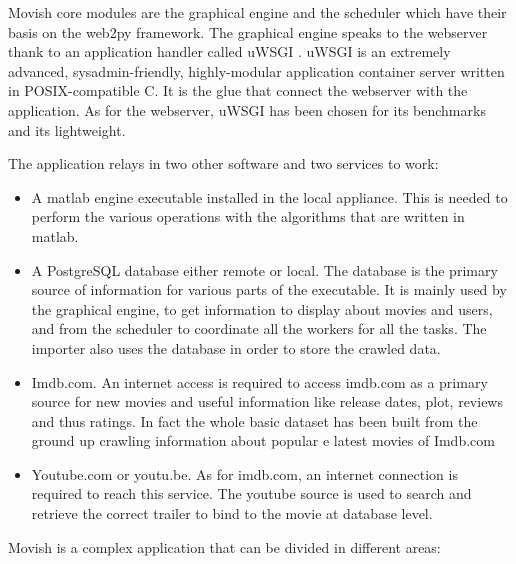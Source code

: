 Movish core modules are the graphical engine and the scheduler which have their basis on the web2py \cite{web2py} framework. The graphical engine speaks to the webserver thank to an application handler called uWSGI \cite{uwsgi}. uWSGI is an extremely advanced, sysadmin-friendly, highly-modular application container server written in POSIX-compatible C. It is the glue that connect the webserver with the application. As for the webserver, uWSGI has been chosen for its benchmarks and its lightweight.

The application relays in two other software and two services to work:

\begin{itemize}
\item A matlab \cite{matlab} engine executable installed in the local appliance. This is needed to perform the various operations with the algorithms that are written in matlab.
\item A PostgreSQL \cite{postgresql} database either remote or local. The database is the primary source of information for various parts of the executable. It is mainly used by the graphical engine, to get information to display about movies and users, and from the scheduler to coordinate all the workers for all the tasks. The importer also uses the database in order to store the crawled data.
\item Imdb.com. An internet access is required to access imdb.com as a primary source for new movies and useful information like release dates, plot, reviews and thus ratings. In fact the whole basic dataset has been built from the ground up crawling information about popular e latest movies of Imdb.com
\item Youtube.com or youtu.be. As for imdb.com, an internet connection is required to reach this service. The youtube source is used to search and retrieve the correct trailer to bind to the movie at database level.
\end{itemize}

Movish is a complex application that can be divided in different areas:

